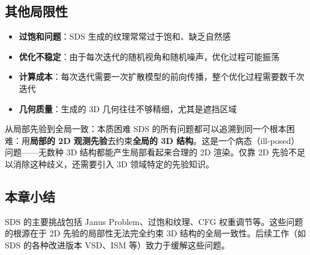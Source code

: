 \subsection{其他局限性}

\begin{itemize}
    \item \textbf{过饱和问题}：SDS 生成的纹理常常过于饱和、缺乏自然感
    \item \textbf{优化不稳定}：由于每次迭代的随机视角和随机噪声，优化过程可能振荡
    \item \textbf{计算成本}：每次迭代需要一次扩散模型的前向传播，整个优化过程需要数千次迭代
    \item \textbf{几何质量}：生成的 3D 几何往往不够精细，尤其是遮挡区域
\end{itemize}

\begin{warningbox}{从局部先验到全局一致：本质困难}
SDS 的所有问题都可以追溯到同一个根本困难：用\textbf{局部的 2D 观测先验}去约束\textbf{全局的 3D 结构}。这是一个病态（ill-posed）问题——无数种 3D 结构都能产生局部看起来合理的 2D 渲染。仅靠 2D 先验不足以消除这种歧义，还需要引入 3D 领域特定的先验知识。
\end{warningbox}

\subsection{本章小结}

SDS 的主要挑战包括 Janus Problem、过饱和纹理、CFG 权重调节等。这些问题的根源在于 2D 先验的局部性无法完全约束 3D 结构的全局一致性。后续工作（如 SDS 的各种改进版本 VSD、ISM 等）致力于缓解这些问题。

\newpage
